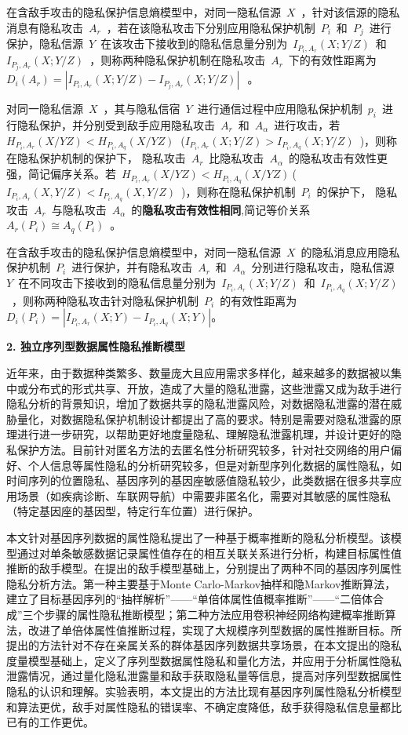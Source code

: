 \documentclass[pdftex,notypeinfo,twoside,openany,UTF8,fntef]{CASthesis}
\theoremstyle{THrm}{
	\newtheorem{question}{Question}[section]
	\newtheorem{property}{性质}[section]
	\newtheorem{assumption}{假设}[section]
	\newtheorem{claim}[lemma]{断言}
	
}
\begin{document}
在含敌手攻击的隐私保护信息熵模型中，对同一隐私信源~$X$~，针对该信源的隐私消息有隐私攻击~$A_{r}$~，若在该隐私攻击下分别应用隐私保护机制~$P_{i}$~和~$P_{j}$~进行保护，隐私信源~$Y$~在该攻击下接收到的隐私信息量分别为~$I_{P_{i},A_{r}}(X;Y/Z)$~和~$I_{P_{j},A_{r}}(X;Y/Z)$~，则称两种隐私保护机制在隐私攻击~$A_{r}$~下的有效性距离为~$D_{i}(A_{r})=\left | I_{P_{i},A_{r}}(X;Y/Z)-I_{P_{j},A_{r}}(X;Y/Z) \right |~$~。

对同一隐私信源~$X$~，其与隐私信宿~$Y$~进行通信过程中应用隐私保护机制~$p_{i}$~进行隐私保护，并分别受到敌手应用隐私攻击~$A_{r}$~和~$A_{\alpha }$~进行攻击，若~${{H}_{{{P}_{i}},{{A}_{r}}}}(X/YZ)<{{H}_{{{P}_{i}},{{A}_{q}}}}(X/YZ)~$ (${{I}_{{{P}_{i}},{{A}_{r}}}}(X;Y/Z)>{{I}_{{{P}_{i}},{{A}_{q}}}}(X;Y/Z)$~)，则称在隐私保护机制的保护下， 隐私攻击~$A_{r}$~比隐私攻击~$A_{\alpha }$~的隐私攻击有效性更强，简记偏序关系。若~$H_{P_{i},A_{r}}(X/YZ)<H_{P_{i},A_{q}}(X/YZ)~$(~$I_{P_{i},A_{r}}(X,Y/Z)<I_{P_{i},A_{q}}(X,Y/Z)$~)，则称在隐私保护机制~$P_{i}$~的保护下， 隐私攻击~$A_{r}$~与隐私攻击~$A_{\alpha }$~的\textbf{隐私攻击有效性相同},简记等价关系~$A_{r}(P_{i})\cong A_{q}(P_{i})$~。

在含敌手攻击的隐私保护信息熵模型中，对同一隐私信源~$X$~的隐私消息应用隐私保护机制~$P_{i}$~进行保护，并有隐私攻击~$A_{r}$~和~$A_{\alpha}$~分别进行隐私攻击，隐私信源~$Y$~在不同攻击下接收到的隐私信息量分别为~$I_{P_{i},A_{r}}(X;Y/Z)$~和~$I_{P_{i},A_{q}}(X;Y/Z)$~，则称两种隐私攻击针对隐私保护机制~$P_{i}$~的有效性距离为
$D_{i}(P_{i})=\left | I_{P_{i},A_{r}}(X;Y)-I_{P_{i},A_{q}}(X;Y) \right |$。


\textbf{2.	独立序列型数据属性隐私推断模型}

近年来，由于数据种类繁多、数量庞大且应用需求多样化，越来越多的数据被以集中或分布式的形式共享、开放，造成了大量的隐私泄露，这些泄露又成为敌手进行隐私分析的背景知识，增加了数据共享的隐私泄露风险，对数据隐私泄露的潜在威胁量化，对数据隐私保护机制设计都提出了高的要求。特别是需要对隐私泄露的原理进行进一步研究，以帮助更好地度量隐私、理解隐私泄露机理，并设计更好的隐私保护方法。目前针对匿名方法的去匿名性分析研究较多，针对社交网络的用户偏好、个人信息等属性隐私的分析研究较多，但是对新型序列化数据的属性隐私，如时间序列的位置隐私、基因序列的基因座敏感值隐私较少，此类数据在很多共享应用场景（如疾病诊断、车联网导航）中需要非匿名化，需要对其敏感的属性隐私（特定基因座的基因型，特定行车位置）进行保护。

本文针对基因序列数据的属性隐私提出了一种基于概率推断的隐私分析模型。该模型通过对单条敏感数据记录属性值存在的相互关联关系进行分析，构建目标属性值推断的敌手模型。在提出的敌手模型基础上，分别提出了两种不同的基因序列属性隐私分析方法。第一种主要基于Monte Carlo-Markov抽样和隐Markov推断算法，建立了目标基因序列的“抽样解析”——“单倍体属性值概率推断”——“二倍体合成”三个步骤的属性隐私推断模型；第二种方法应用卷积神经网络构建概率推断算法，改进了单倍体属性值推断过程，实现了大规模序列型数据的属性推断目标。所提出的方法针对不存在亲属关系的群体基因序列数据共享场景，在本文提出的隐私度量模型基础上，定义了序列型数据属性隐私和量化方法，并应用于分析属性隐私泄露情况，通过量化隐私泄露量和敌手获取隐私量等信息，提高对序列型数据属性隐私的认识和理解。实验表明，本文提出的方法比现有基因序列属性隐私分析模型和算法更优，敌手对属性隐私的错误率、不确定度降低，敌手获得隐私信息量都比已有的工作更优。
\end{document}
